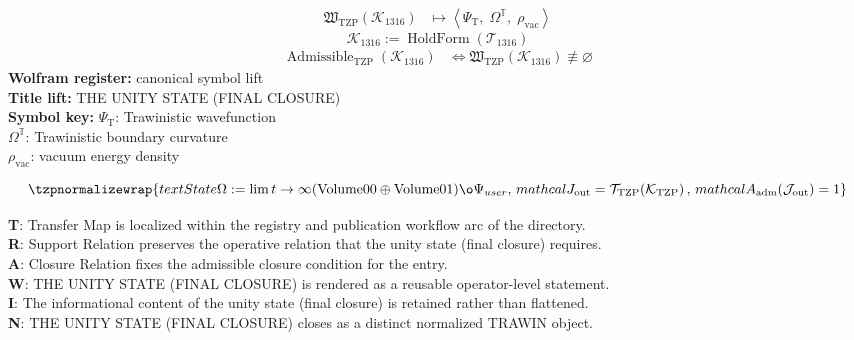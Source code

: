 \noindent
\begin{minipage}[t]{0.48\linewidth}
\begingroup
\small
\[
\begin{aligned}
\mathfrak{W}_{\mathrm{TZP}}\!\left(\mathcal{K}_{1316}\right)
&\longmapsto
\left\langle \Psi_{\mathrm{T}},\; \Omega^{\mathbb{T}},\; \rho_{\mathrm{vac}} \right\rangle
\end{aligned}
\]
\[
\mathcal{K}_{1316}
:=
\operatorname{HoldForm}\!\left(\mathcal{T}_{1316}\right)
\]
\[
\begin{aligned}
\operatorname{Admissible}_{\mathrm{TZP}}\!\left(\mathcal{K}_{1316}\right)
&\Longleftrightarrow
\mathfrak{W}_{\mathrm{TZP}}\!\left(\mathcal{K}_{1316}\right)\not\equiv\varnothing
\end{aligned}
\]
\textbf{Wolfram register:} canonical symbol lift\\
\textbf{Title lift:} THE UNITY STATE (FINAL CLOSURE)\\
\textbf{Symbol key:} \(\Psi_{\mathrm{T}}\): Trawinistic wavefunction\\ \(\Omega^{\mathbb{T}}\): Trawinistic boundary curvature\\ \(\rho_{\mathrm{vac}}\): vacuum energy density
\par
\endgroup
\end{minipage}\hfill
\begin{minipage}[t]{0.48\linewidth}
\[
\tzpnormalizewrap{text{State} {\Omega} := \lim {t \to \infty} (\text{Volume} {00} \oplus \text{Volume} {01}) \o\Psi_{user},\,mathcal{J}_{\mathrm{out}} = \mathcal{T}_{\mathrm{TZP}}\!\left(\mathcal{K}_{\mathrm{TZP}}\right),\,mathcal{A}_{\mathrm{adm}}\!\left(\mathcal{J}_{\mathrm{out}}\right)=1}
\]

\small
\textbf{T}: Transfer Map is localized within the registry and publication workflow arc of the directory.\\
\textbf{R}: Support Relation preserves the operative relation that the unity state (final closure) requires.\\
\textbf{A}: Closure Relation fixes the admissible closure condition for the entry.\\
\textbf{W}: THE UNITY STATE (FINAL CLOSURE) is rendered as a reusable operator-level statement.\\
\textbf{I}: The informational content of the unity state (final closure) is retained rather than flattened.\\
\textbf{N}: THE UNITY STATE (FINAL CLOSURE) closes as a distinct normalized TRAWIN object.
\normalsize
\end{minipage}


